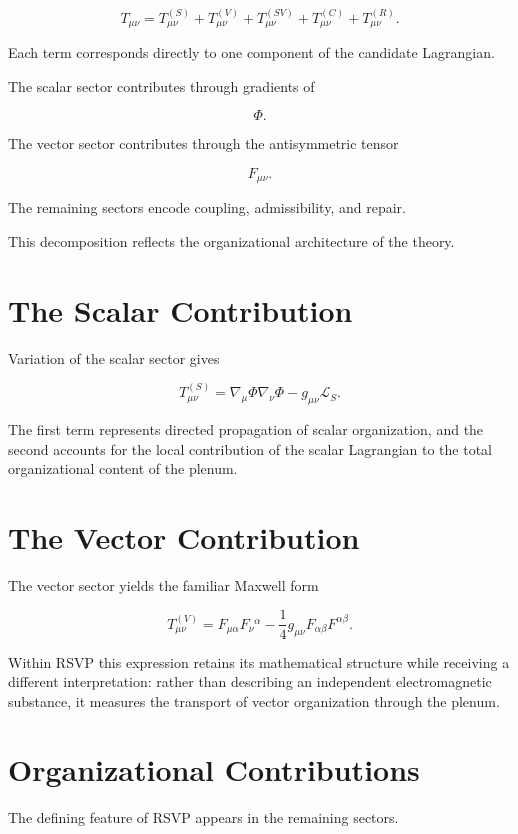 \documentclass[11pt,oneside]{book}
\numberwithin{equation}{chapter}
\theoremstyle{definition}
\theoremstyle{plain}
\begin{document}
\[
T_{\mu\nu}
=
T^{(S)}_{\mu\nu}
+
T^{(V)}_{\mu\nu}
+
T^{(SV)}_{\mu\nu}
+
T^{(C)}_{\mu\nu}
+
T^{(R)}_{\mu\nu}.
\]

Each term corresponds directly to one component of the candidate
Lagrangian.

The scalar sector contributes through gradients of

\[
\Phi.
\]

The vector sector contributes through the antisymmetric tensor

\[
F_{\mu\nu}.
\]

The remaining sectors encode coupling, admissibility, and repair.

This decomposition reflects the organizational architecture of the theory.

\section{The Scalar Contribution}

Variation of the scalar sector gives

\[
\boxed{
T^{(S)}_{\mu\nu}
=
\nabla_\mu\Phi
\nabla_\nu\Phi
-
g_{\mu\nu}
\mathcal L_S.
}
\]

The first term represents directed propagation of scalar organization, and the second accounts for the local contribution of the scalar Lagrangian to the total organizational content of the plenum.

\section{The Vector Contribution}

The vector sector yields the familiar Maxwell form

\[
\boxed{
T^{(V)}_{\mu\nu}
=
F_{\mu\alpha}
F_{\nu}{}^{\alpha}
-
\frac14
g_{\mu\nu}
F_{\alpha\beta}
F^{\alpha\beta}.
}
\]

Within RSVP this expression retains its mathematical structure while receiving a different interpretation: rather than describing an independent electromagnetic substance, it measures the transport of vector organization through the plenum.

\section{Organizational Contributions}

The defining feature of RSVP appears in the remaining sectors.
\end{document}
